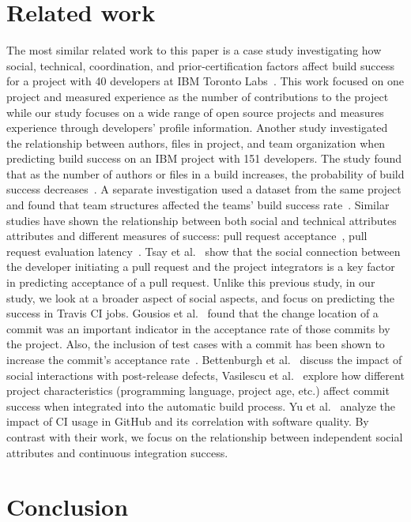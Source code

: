 \documentclass[10pt, conference]{IEEEtran}
\begin{document}
\section{Related work}
The most similar related work to this paper is a case study investigating how
social, technical, coordination, and prior-certification factors affect build
success for a project with 40 developers at IBM Toronto Labs~\cite{Hassan06}.  This work 
focused on one project and measured experience as the number of contributions to
the project while our study focuses on a wide range of open source projects and
measures experience through developers' profile information.
Another study investigated the relationship between authors, files in project,
and team organization when predicting build
success on an IBM project with 151 developers.  The study found that as the
number of authors or files in a build increases, the probability of build
success decreases~\cite{Kwan11}. A separate investigation used a dataset from the
same project and
found that team structures affected the teams' build success rate~\cite{Wolf09}.
Similar studies have shown the relationship between both social and technical attributes attributes and 
different measures of success: pull request acceptance~\cite{gousios14, 
gousios15,tsay14icse,tsay14fse}, pull request evaluation latency~\cite{Yu15}.
Tsay et al.~\cite{tsay14icse} 
show that the social connection between the developer initiating a
pull request and the project integrators is a key factor in predicting 
acceptance of a pull 
request. Unlike this previous study, in our study, we look at a broader aspect of 
social aspects, and focus on predicting the success in Travis
CI jobs. Gousios et al.~\cite{gousios14} found that the change location of a commit was
an important indicator in the acceptance rate of those commits by the project.
Also, the inclusion of test cases with a commit has been shown to increase the
commit's acceptance rate~\cite{gousios15}.
Bettenburgh et 
al.~\cite{bettenburgh10} discuss the impact of social interactions with 
post-release defects, Vasilescu et al.~\cite{vasilescu14} explore how different 
project characteristics (programming language, project age, etc.) affect commit 
success when integrated into the automatic build process. Yu et al.~\cite{yu16} 
analyze the impact of CI usage in GitHub and its correlation with software 
quality. By contrast with their work, we focus on the relationship between independent social 
attributes and continuous integration success. 

\section{Conclusion}
\end{document}
